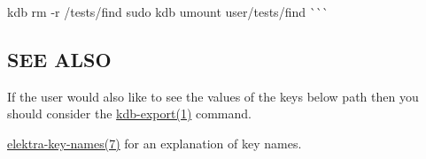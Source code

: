 kdb rm -\/r /tests/find sudo kdb umount user/tests/find \`{}\`{}\`{}\hypertarget{doc_help_kdb-find_md_autotoc_md1690}{}\subsection{S\+E\+E A\+L\+SO}\label{doc_help_kdb-find_md_autotoc_md1690}

\begin{DoxyItemize}
\item If the user would also like to see the values of the keys below {\ttfamily path} then you should consider the \mbox{\hyperlink{doc_help_kdb-export_md}{kdb-\/export(1)}} command.
\item \mbox{\hyperlink{doc_help_elektra-key-names_md}{elektra-\/key-\/names(7)}} for an explanation of key names. 
\end{DoxyItemize}